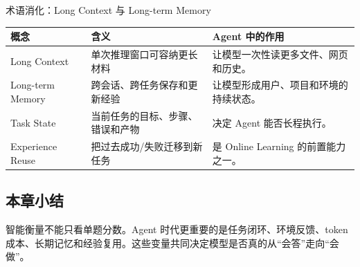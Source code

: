 \begin{knowledgebox}{术语消化：Long Context 与 Long-term Memory}
\noindent\begin{tabularx}{\textwidth}{p{}p{}X}
\toprule
概念 & 含义 & Agent 中的作用 \\
\midrule
Long Context & 单次推理窗口可容纳更长材料 & 让模型一次性读更多文件、网页和历史。 \\
Long-term Memory & 跨会话、跨任务保存和更新经验 & 让模型形成用户、项目和环境的持续状态。 \\
Task State & 当前任务的目标、步骤、错误和产物 & 决定 Agent 能否长程执行。 \\
Experience Reuse & 把过去成功/失败迁移到新任务 & 是 Online Learning 的前置能力之一。 \\
\bottomrule
\end{tabularx}
\end{knowledgebox}

\subsection{本章小结}

智能衡量不能只看单题分数。Agent 时代更重要的是任务闭环、环境反馈、token 成本、长期记忆和经验复用。这些变量共同决定模型是否真的从“会答”走向“会做”。

